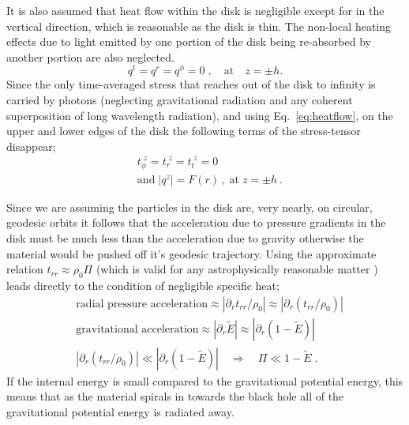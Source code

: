 It is also assumed that heat flow within the disk is negligible except for in the vertical direction, which is reasonable as the disk is thin. The non-local heating effects due to light emitted by one portion of the disk being re-absorbed by another portion are also neglected.
\begin{equation}\label{eq:heatflow} q^{t}=q^{r}=q^{\phi}= 0\;,\quad \textrm{at}\quad z=\pm h.\end{equation}
Since the only time-averaged stress that reaches out of the disk to infinity is carried by photons (neglecting gravitational radiation and any coherent superposition of long wavelength radiation), and using Eq.\ \ref{eq:heatflow}, on the upper and lower edges of the disk the following terms of the stress-tensor disappear;
\begin{eqnarray}\label{eq:tcomp} &t_{\phi}^{\; z}= t_{r}^{\; z}= t_{t}^{\; z} =0 \nonumber \\
&\textrm{and}\; \left| q^{z} \right|=F(r)\,,\;\textrm{at}\; z=\pm h \,.\end{eqnarray}

Since we are assuming the particles in the disk are, very nearly, on circular, geodesic orbits it follows that the acceleration due to pressure gradients in the disk must be much less than the acceleration due to gravity otherwise the material would be pushed off it's geodesic trajectory. Using the approximate relation $t_{rr}\approx\rho_{0}\Pi$ (which is valid for any astrophysically reasonable matter \cite{1974ApJ...191..499P}) leads directly to the condition of negligible specific heat;
\begin{eqnarray}
&\textrm{radial pressure acceleration} \approx \left| \partial_{r}t_{rr}/\rho_{0} \right| \approx \left| \partial_{r}\left( t_{rr}/\rho_{0}\right)  \right| \nonumber\\
&\textrm{gravitational acceleration} \approx | \partial_{r}\tilde{E} | \approx | \partial_{r}( 1-\tilde{E} ) | \nonumber\\
& | \partial_{r} (t_{rr}/\rho_{0} ) | \ll | \partial_{r}( 1-\tilde{E} ) |\quad \Rightarrow \quad \Pi \ll 1-\tilde{E}\; .
\end{eqnarray}
If the internal energy is small compared to the gravitational potential energy, this means that as the material spirals in towards the black hole all of the gravitational potential energy is radiated away.


